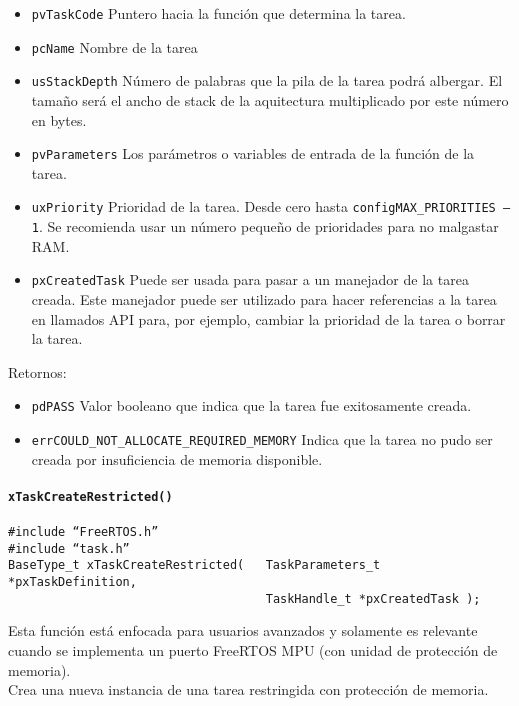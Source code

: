 \begin{itemize}
    \item \texttt{pvTaskCode} Puntero hacia la función que determina la tarea.
    \item \texttt{pcName} Nombre de la tarea 
    \item \texttt{usStackDepth} Número de palabras que la pila de la tarea podrá albergar. El tamaño será el ancho de stack de la aquitectura multiplicado por este número en bytes.
    \item \texttt{pvParameters} Los parámetros o variables de entrada de la función de la tarea. 
    \item \texttt{uxPriority} Prioridad de la tarea. Desde cero hasta \texttt{configMAX\_PRIORITIES – 1}. Se recomienda usar un número pequeño de prioridades para no malgastar RAM.
    \item \texttt{pxCreatedTask} Puede ser usada para pasar a un manejador de la tarea creada. Este manejador puede ser utilizado para hacer referencias a la tarea en llamados API para, por ejemplo, cambiar la prioridad de la tarea o borrar la tarea.
\end{itemize}


Retornos:

\begin{itemize}
    \item \texttt{pdPASS} Valor booleano que indica que la tarea fue exitosamente creada.
    \item \texttt{errCOULD\_NOT\_ALLOCATE\_REQUIRED\_MEMORY} Indica que la tarea no pudo ser creada por insuficiencia de memoria disponible.
\end{itemize}

\paragraph{\texttt{xTaskCreateRestricted()}}
\begin{verbatim}
#include “FreeRTOS.h”
#include “task.h”
BaseType_t xTaskCreateRestricted(   TaskParameters_t *pxTaskDefinition,
                                    TaskHandle_t *pxCreatedTask );
\end{verbatim}          

Esta función está enfocada para usuarios avanzados y solamente es relevante cuando se implementa un puerto FreeRTOS MPU (con unidad de protección de memoria).\\

Crea una nueva instancia de una tarea restringida con protección de memoria.

